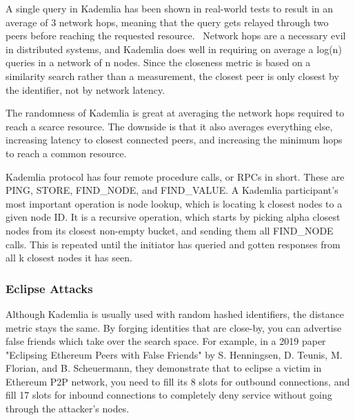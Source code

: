 A single query in Kademlia has been shown in real-world tests to result in an average of 3 network hops, meaning that the query gets relayed through two peers before reaching the requested resource.~\cite{Roos2013-mb} Network hops are a necessary evil in distributed systems, and Kademlia does well in requiring on average a log(n) queries in a network of n nodes. Since the closeness metric is based on a similarity search rather than a measurement, the closest peer is only closest by the identifier, not by network latency.~\cite{Eigenmann2020-zm}
						
The randomness of Kademlia is great at averaging the network hops required to reach a scarce resource. The downside is that it also averages everything else, increasing latency to closest connected peers, and increasing the minimum hops to reach a common resource.

Kademlia protocol has four remote procedure calls, or RPCs in short. These are PING, STORE, FIND\_NODE, and FIND\_VALUE. A Kademlia participant's most important operation is node lookup, which is locating k closest nodes to a given node ID. It is a recursive operation, which starts by picking alpha closest nodes from its closest non-empty bucket, and sending them all FIND\_NODE calls. This is repeated until the initiator has queried and gotten responses from all k closest nodes it has seen.

\subsubsection{Eclipse Attacks}
Although Kademlia is usually used with random hashed identifiers, the distance metric stays the same. By forging identities that are close-by, you can advertise false friends which take over the search space. For example, in a 2019 paper "Eclipsing Ethereum Peers with False Friends" by S. Henningsen, D. Teunis, M. Florian, and B. Scheuermann, they demonstrate that to eclipse a victim in Ethereum P2P network, you need to fill its 8 slots for outbound connections, and fill 17 slots for inbound connections to completely deny service without going through the attacker's nodes.~\cite{Henningsen2019-mf}

